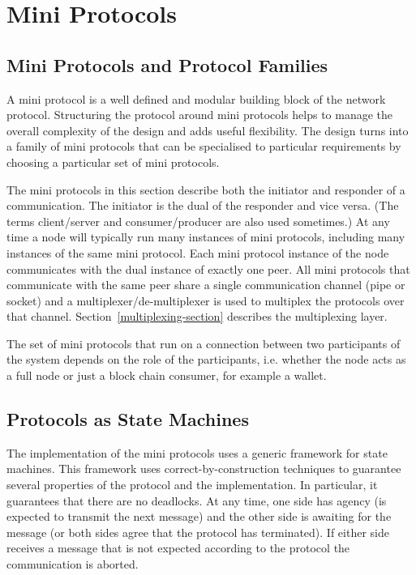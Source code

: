 \chapter{Mini Protocols}
\label{state-machine-section}

\section{Mini Protocols and Protocol Families}
A mini protocol is a well defined and modular building block of
the network protocol.
Structuring the protocol around mini protocols helps to manage the overall complexity of
the design and adds useful flexibility.
The design turns into a family of mini protocols that can be specialised to particular requirements
by choosing a particular set of mini protocols.

The mini protocols in this section describe both the initiator and responder of a communication.
The initiator is the dual of the responder and vice versa.
(The terms client/server and consumer/producer are also used sometimes.)
At any time a node will typically run many instances of mini protocols, including many instances of the
same mini protocol.
Each mini protocol instance of the node communicates with the dual
instance of exactly one peer.
All mini protocols that communicate with the same peer
share a single communication channel (pipe or socket)
and a multiplexer/de-multiplexer is used to multiplex the protocols over that channel.
Section~\ref{multiplexing-section} describes the multiplexing layer.

The set of mini protocols that run on a connection between two participants of the system
depends on the role of the participants, i.e. whether the node acts as a full node or just
a block chain consumer, for example a wallet.

\section{Protocols as State Machines}
The implementation of the mini protocols uses a generic framework for state machines.
This framework uses correct-by-construction techniques to guarantee
several properties of the protocol and the implementation.
In particular, it guarantees that there are no deadlocks.
At any time, one side has agency
(is expected to transmit the next message) and the other side is awaiting for
the message (or both sides agree that the protocol has terminated).
If either side receives a message that is not expected according to the protocol
the communication is aborted.

